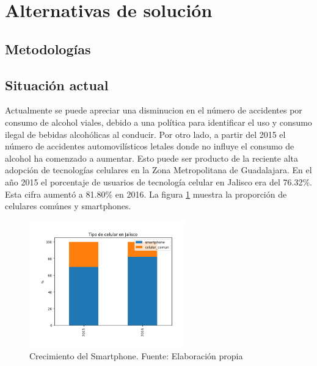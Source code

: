 \documentclass{article}
\begin{document}
\newpage

\section{Alternativas de solución}\label{sec:alternatives}

% 

\subsection{Metodologías}

\subsection{Situación actual}\label{subsec:actual}

Actualmente se puede apreciar una disminucion en el número de accidentes por consumo de alcohol  viales, debido a una política para identificar el uso y consumo ilegal de bebidas alcohólicas al conducir.
Por otro lado, a partir del 2015 el número de accidentes automovilísticos letales donde no influye el consumo de alcohol ha comenzado a aumentar. Esto puede ser producto de la reciente alta adopción de tecnologías celulares en la Zona Metropolitana de Guadalajara. En el año 2015 el porcentaje de usuarios de tecnología celular en Jalisco
era del 76.32\%. Esta cifra aumentó a 81.80\% en 2016. La figura \ref{fig:tipo_celular} muestra la
proporción de celulares comúnes y smartphones.


	\begin{figure}[H]\centering
	\includegraphics[width=0.6\textwidth]{resources/img/tipo_de_celular.png}
	\caption{\label{fig:tipo_celular} Crecimiento del Smartphone. Fuente: Elaboración propia}
    \end{figure}
\end{document}
